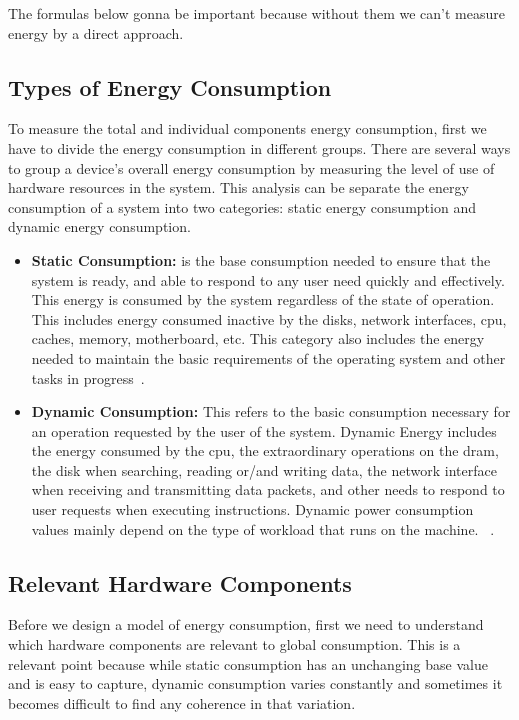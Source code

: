 

The formulas below gonna be important because without them we can't measure energy by a direct approach.

\subsection{Types of Energy Consumption}
To measure the total and individual components energy consumption, first we have to divide the energy consumption in different groups. There are several ways to group a device's overall energy consumption by measuring the level of use of hardware resources in the system. This analysis can be separate the energy consumption of a system into two categories: static energy consumption and dynamic energy consumption.

\begin{itemize}
    \item \textbf{Static Consumption:} is the base consumption needed to ensure that the system is ready, and able to respond to any user need quickly and effectively. This energy is consumed by the system regardless of the state of operation. This includes energy consumed inactive by the disks, network interfaces, \gls{cpu}, caches, memory, motherboard, etc. This category also includes the energy needed to maintain the basic requirements of the operating system and other tasks in progress~\cite{portela2016}.
    
   \item \textbf{Dynamic Consumption:} This refers to the basic consumption necessary for an operation requested by the user of the system. Dynamic Energy includes the energy consumed by the \gls{cpu}, the extraordinary operations on the \gls{dram}, the disk when searching, reading or/and writing data, the network interface when receiving and transmitting data packets, and other needs to respond to user requests when executing instructions. Dynamic power consumption values mainly depend on the type of workload that runs on the machine. ~\cite{portela2016}.
  \end{itemize}
  

\subsection{Relevant Hardware Components}

Before we design a model of energy consumption, first we need to understand which hardware components are relevant to global consumption. This is a relevant point because while static consumption has an unchanging base value and is easy to capture, dynamic consumption varies constantly and sometimes it becomes difficult to find any coherence in that variation. 

